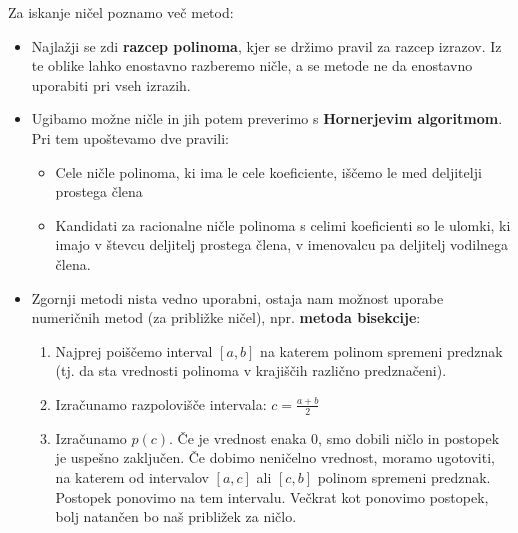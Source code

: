 Za iskanje ničel poznamo več metod:
\begin{itemize}
\item Najlažji se zdi \textbf{razcep polinoma}, kjer se držimo pravil za razcep izrazov. Iz te oblike lahko enostavno razberemo ničle, a se metode ne da enostavno uporabiti pri vseh izrazih.
\item Ugibamo možne ničle in jih potem preverimo s \textbf{Hornerjevim algoritmom}. Pri tem upoštevamo dve pravili: 
\begin{itemize}
\item Cele ničle polinoma, ki ima le cele koeficiente, iščemo le med deljitelji prostega člena 
\item Kandidati za racionalne ničle polinoma s celimi koeficienti so le ulomki, ki imajo v števcu deljitelj prostega člena, v imenovalcu pa deljitelj vodilnega člena.
\end{itemize}
\item Zgornji metodi nista vedno uporabni, ostaja nam možnost uporabe numeričnih metod (za približke ničel), npr. \textbf{metoda bisekcije}:\begin{enumerate}
\item Najprej poiščemo interval $[a, b]$ na katerem polinom spremeni predznak (tj. da sta vrednosti polinoma v krajiščih različno predznačeni).
\item Izračunamo razpolovišče intervala: $c=\frac{a+b}{2}$
\item Izračunamo $p(c)$. Če je vrednost enaka $0$, smo dobili ničlo in postopek je uspešno zaključen. Če dobimo neničelno vrednost, moramo ugotoviti, na katerem od intervalov $[a, c]$ ali $[c, b]$ polinom spremeni predznak. Postopek ponovimo na tem intervalu. Večkrat kot ponovimo postopek, bolj natančen bo naš približek za ničlo. 
\end{enumerate}
\end{itemize}

